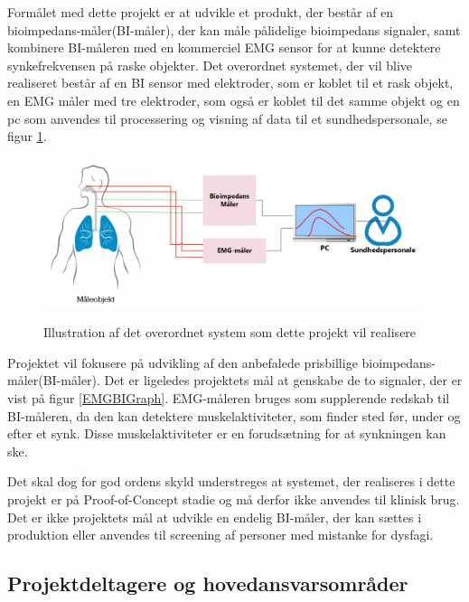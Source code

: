 Formålet med dette projekt er at udvikle et produkt, der består af en bioimpedans-måler(BI-måler), der kan måle pålidelige bioimpedans signaler, samt kombinere BI-måleren med en kommerciel EMG sensor for at kunne detektere synkefrekvensen på raske objekter. Det overordnet systemet, der vil blive realiseret består af en BI sensor med elektroder, som er koblet til et rask objekt, en EMG måler med tre elektroder, som også er koblet til det samme objekt og en pc som anvendes til processering og visning af data til et sundhedspersonale, se figur \ref{KonceptuelDiagram}.  

\begin{figure}[H]
\centering
{\includegraphics[width=11cm]
{Figure/KonceptuelDiagram}}
\caption{Illustration af  det overordnet system som dette projekt vil realisere}
\label{KonceptuelDiagram}
\end{figure}

Projektet vil fokusere på udvikling af den anbefalede prisbillige bioimpedans-måler(BI-måler). Det er ligeledes projektets mål at genskabe de to signaler, der er vist på figur \ref{EMGBIGraph}. EMG-måleren bruges som supplerende redskab til BI-måleren, da den kan detektere muskelaktiviteter, som finder sted før, under og efter et synk. Disse muskelaktiviteter er en forudsætning for at synkningen kan ske. 

Det skal dog for god ordens skyld understreges at systemet, der realiseres i dette projekt er på Proof-of-Concept stadie og må derfor ikke anvendes til klinisk brug. Det er ikke projektets mål at udvikle en endelig BI-måler, der kan sættes i produktion eller anvendes til screening af personer med mistanke for dysfagi. 

\subsection{Projektdeltagere og hovedansvarsområder} 

%

